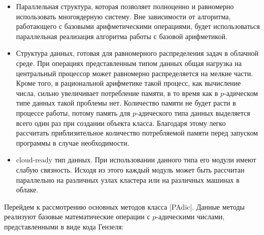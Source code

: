 \documentclass[master, och, diploma, times]{sty/SCWorks}
\theoremstyle{plain}
\theoremstyle{definition}
\numberwithin{equation}{section}
\begin{document}
\begin{itemize}
\item Параллельная структура, которая позволяет полноценно и равномерно использовать многоядерную систему. Вне зависимости от алгоритма, работающего с базовыми арифметическими операциями, будет использоваться параллельная реализация алгоритма работы с базовой арифметикой.
\item Структура данных, готовая для равномерного распределения задач в облачной среде. При операциях представленным типом данных общая нагрузка на центральный процессор может равномерно распределяется на мелкие части. Кроме того, в рациональной арифметике такой процесс, как вычисление числа, сильно увеличивает потребление памяти, в то время как в $p$-адическом типе данных такой проблемы нет. Количество памяти не будет расти в процессе работы, потому память для $p$-адического типа данных выделяется всего один раз при создании объекта класса. Благодаря этому легко рассчитать приблизительное количество потребляемой памяти перед запуском программы в случае необходимости.
\item cloud-ready тип данных. При использовании данного типа его модули имеют слабую связность. Исходя из этого каждый модуль может быть рассчитан параллельно на различных узлах кластера или на различных машинах в облаке.
\end{itemize}

Перейдем к рассмотрению основных методов класса |PAdic|. Данные методы реализуют базовые математические операции с $p$-адическими числами, представленными в виде кода Гензеля:
\end{document}
